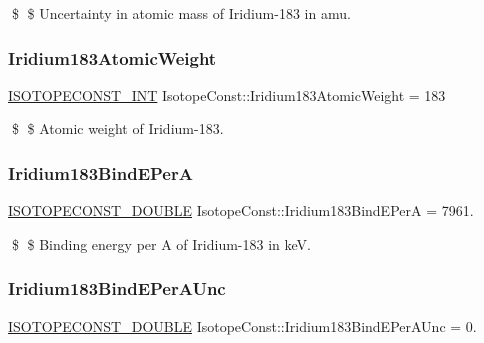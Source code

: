 \$ \$ Uncertainty in atomic mass of Iridium-\/183 in amu. \mbox{\label{group___isotope_const-_iridium-_ir183_gaf4d8ba202f96002aaa2a75c87951db82}} 
\subsubsection{\texorpdfstring{Iridium183\+Atomic\+Weight}{Iridium183AtomicWeight}}
{\footnotesize\ttfamily \mbox{\hyperlink{group___isotope_const-_macros_ga5f18360b3e99483a35c32d789e62621c}{I\+S\+O\+T\+O\+P\+E\+C\+O\+N\+S\+T\+\_\+\+I\+NT}} Isotope\+Const\+::\+Iridium183\+Atomic\+Weight = 183}

\$ \$ Atomic weight of Iridium-\/183. \mbox{\label{group___isotope_const-_iridium-_ir183_ga00c7ebe49bd0663fe80c99cf4325652e}} 
\subsubsection{\texorpdfstring{Iridium183\+Bind\+E\+PerA}{Iridium183BindEPerA}}
{\footnotesize\ttfamily \mbox{\hyperlink{group___isotope_const-_macros_ga8f45a7272ce02c0b4c65c44636ed719a}{I\+S\+O\+T\+O\+P\+E\+C\+O\+N\+S\+T\+\_\+\+D\+O\+U\+B\+LE}} Isotope\+Const\+::\+Iridium183\+Bind\+E\+PerA = 7961.}

\$ \$ Binding energy per A of Iridium-\/183 in keV. \mbox{\label{group___isotope_const-_iridium-_ir183_ga9603cf63f5458b8b900a75184a3e44dc}} 
\subsubsection{\texorpdfstring{Iridium183\+Bind\+E\+Per\+A\+Unc}{Iridium183BindEPerAUnc}}
{\footnotesize\ttfamily \mbox{\hyperlink{group___isotope_const-_macros_ga8f45a7272ce02c0b4c65c44636ed719a}{I\+S\+O\+T\+O\+P\+E\+C\+O\+N\+S\+T\+\_\+\+D\+O\+U\+B\+LE}} Isotope\+Const\+::\+Iridium183\+Bind\+E\+Per\+A\+Unc = 0.}

